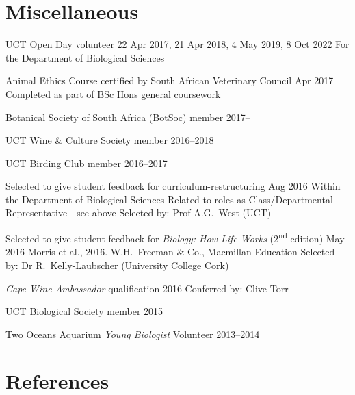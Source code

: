 \documentclass[10pt]{article}
\begin{document}
\clearpage %

\section*{Miscellaneous} %

\begin{hangparas}{2em}{1}

UCT Open Day volunteer \hfill 22 Apr 2017, 21 Apr 2018, 4 May 2019, 8 Oct 2022 \break
For the Department of Biological Sciences

Animal Ethics Course certified by South African Veterinary Council
                                                          \hfill Apr 2017 \break
Completed as part of BSc Hons general coursework

Botanical Society of South Africa (BotSoc) member                  \hfill 2017--

UCT Wine \& Culture Society member                             \hfill 2016--2018

UCT Birding Club member                                        \hfill 2016--2017

Selected to give student feedback for curriculum-restructuring
                                                          \hfill Aug 2016 \break
Within the Department of Biological Sciences                              \break
Related to roles as Class/Departmental Representative---see above         \break
Selected by: Prof A.G.~West (UCT)

Selected to give student feedback for \textit{Biology: How Life Works}
(2\textsuperscript{nd} edition)                           \hfill May 2016 \break
Morris et al., 2016. W.H.~Freeman \& Co., Macmillan Education             \break
Selected by: Dr R.~Kelly-Laubscher (University College Cork)

\textit{Cape Wine Ambassador} qualification                   \hfill 2016 \break
Conferred by: Clive Torr

UCT Biological Society member                                        \hfill 2015

Two Oceans Aquarium \textit{Young Biologist} Volunteer         \hfill 2013--2014

\hfill

\end{hangparas}

\section*{References} %
\end{document}
